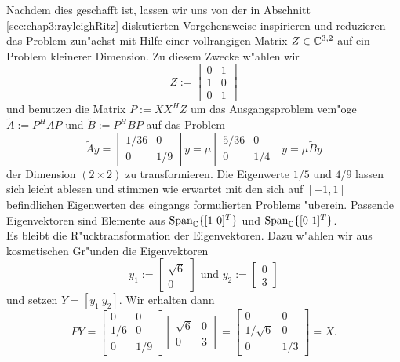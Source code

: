\newpage

Nachdem dies geschafft ist, lassen wir uns von der in Abschnitt \ref{sec:chap3:rayleighRitz} diskutierten Vorgehensweise inspirieren und reduzieren das Problem zun"achst mit
Hilfe einer vollrangigen Matrix $Z \in\mathbb{C}^{3,2}$ auf ein Problem kleinerer Dimension.
Zu diesem Zwecke w"ahlen wir
\[
Z:=\begin{bmatrix} 0 & 1 \\ 1 & 0 \\ 0 & 1\end{bmatrix}
\]
und benutzen die Matrix $P :=X X^H Z$ um das Ausgangsproblem vem"oge
$\widetilde{A}:= P^H A P$ und $\widetilde{B}:=P^H B P$ auf das Problem
\[
\widetilde{A}y = \begin{bmatrix}1/36 & 0\\0 & 1/9 \end{bmatrix} y = \mu \begin{bmatrix}5/36 & 0\\0 & 1/4 \end{bmatrix} y = \mu \widetilde{B}y
\]
der Dimension $(2\times 2)$ zu transformieren. Die Eigenwerte $1/5$ und $4/9$ lassen sich leicht ablesen
und stimmen wie erwartet mit den sich auf $[-1,1]$ befindlichen Eigenwerten des eingangs formulierten Problems "uberein. Passende Eigenvektoren sind
Elemente aus $\text{Span}_{\mathbb{C}} \{[1 \ 0]^T\}$ und $\text{Span}_{\mathbb{C}} \{[0 \ 1]^T\}$.\\

Es bleibt die R"ucktransformation der Eigenvektoren. Dazu w"ahlen wir aus kosmetischen Gr"unden die Eigenvektoren
\[
y_1 := \begin{bmatrix}
\sqrt6 \\ 0
\end{bmatrix}
\text{ und }
y_2 := \begin{bmatrix}
0 \\ 3
\end{bmatrix}
\]
und setzen $Y = [y_1 \ y_2]$. Wir erhalten dann
\[
PY = \begin{bmatrix} 0 & 0 \\ 1/6 & 0 \\ 0 & 1/9 \end{bmatrix}
\begin{bmatrix}
\sqrt6 & 0 \\ 0 & 3
\end{bmatrix}
=
\begin{bmatrix} 0 & 0  \\ 1/\sqrt6 & 0  \\ 0 & 1/3  \end{bmatrix}
= X.
\]

